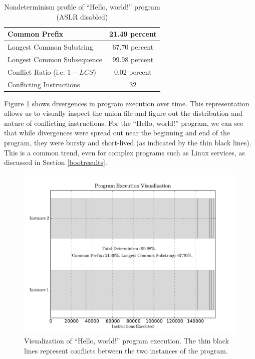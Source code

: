 \begin{table}[h]
\begin{center}
\begin{tabular}{||l|c||}\hline
  Common Prefix & 21.49 percent \\\hline
  Longest Common Substring & 67.70 percent \\\hline
  Longest Common Subsequence & 99.98 percent \\\hline
  Conflict Ratio (i.e. $1 - LCS$) & 0.02 percent \\\hline
  Conflicting Instructions & 32 \\\hline
\end{tabular}
\end{center}
\caption{Nondeterminism profile of ``Hello, world!'' program (ASLR disabled)}
\label{hw:stats}
\end{table}

\newpage
Figure \ref{hw:trace} shows divergences in program execution
over time. This representation allows
us to visually inspect the union file 
and figure out the distribution and nature of conflicting
instructions. For the ``Hello, world!'' program,
we can see that while divergences were 
spread out near the beginning and end of the program,
they were bursty and short-lived (as indicated
by the thin black lines). This is a common trend, 
even for complex programs such as Linux services,
as discussed in Section \ref{bootresults}.


\begin{figure}[h]
  \center
  \includegraphics[scale=0.80, trim=0.3cm 0cm 0cm 0cm]{trace.pdf}
  \caption[Visualization of ``Hello, world!'' program execution]%
          {Visualization of ``Hello, world!'' program execution.
          The thin black lines represent conflicts between
          the two instances of the program.}
  \label{hw:trace}
\end{figure} 

